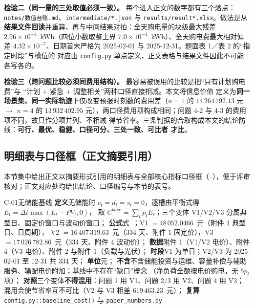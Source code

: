 \textbf{检验二（同一量的三处取值必须一致）。} 每个进入正文的数字都有三个落点：
\texttt{notes/数值台账.md}、\texttt{intermediate/*.json} 与 \texttt{results/result*.xlsx}。做法是从
\textbf{结果文件回读}并重算、再与中间结果对拍：全天购电量的块级最大残差
\(2.96\times10^{-4}\)~kWh（四位小数取整上界 \(7.0\times10^{-4}\)~kWh）、全天购电费最大相对偏差
\(4.32\times10^{-7}\)、日期首末严格为 2025-02-01 与 2025-12-31。题面表 1／表 2 的“指定时段”与槽位的
对应由 \texttt{config.py} 单点定义，正文表格与结果文件因此不可能各写各的。

\textbf{检验三（跨问题比较必须同费用结构）。} 最容易被误用的比较是把“只有计划购电费”与
“计划 \(+\) 紧急 \(+\) 调整相关”两种口径直接相减。本文将信息价值  定义为\textbf{同一
场景集、同一实际轨迹}下仅改变预报时刻数的费用差（\(n=1\) 的 \(14\,264\,792.13\) 元 \(\to\) \(n=4\) 的
\(13\,932\,402.95\) 元），两口径费用项构成相同；问题 4-2 与 4-3 的费用项不同，故只作分项并列、不相减
得节省率。三条判据的合取构成本文的结论防线：\textbf{可行、最优、稳健、口径可分、三处一致、可比者
才比}。

\subsection{明细表与口径框（正文摘要引用）}
本节集中给出正文以摘要形式引用的明细表与全部核心指标口径框（--），便于评审核对；正文对应处均给出结论、口径编号与本节的表号。













\begin{caliber}{C-01}{无储能基线}
\textbf{定义}\quad 无储能时 \(c_t=d_t=s_t=0\)，逐槽由平衡式得 \(E_t=\Delta t\max(L_t-PV_t,0)\)，
取 \(C^{base}=\sum_tp_tE_t\)；三个变体 V1/V2/V3 分属典型日、固定价窗口与波动价窗口；%
\textbf{公式}\quad 式~；V1 \(=48\,052.0466\)~元（附件 1 典型日、日周期），
V2 \(=16\,407\,319.63\)~元（334 天、附件 1 固定价），V3 \(=17\,026\,782.86\)~元（334 天、附件 4
波动价）；%
\textbf{数据}\quad 附件 1（V1/V2 电价）、附件 4（V3 电价）、附件 2 与附件 1（负载与光伏）；%
\textbf{时段}\quad V1 为单日；V2/V3 为 2025-02-01 至 12-31 共 334 天；%
\textbf{单位}\quad 元；%
\textbf{不含}\quad 不含储能投资与运维、容量补偿与辅助服务、输配电价附加；基线中不存在“缺口”概念
（净负荷全额按电价购电，无 \(5p_t\) 项）；%
\textbf{对照}\quad 三个变体\textbf{不得混用}：问题 1 用 V1、问题 2/3 用 V2、问题 4 用 V3；
混用会使节省率互不可比（V2 与 V3 相差 \(619\,463.23\)~元）；%
\textbf{复算}\quad \texttt{config.py::baseline\_cost()} 与 \texttt{paper\_numbers.py}
\end{caliber}

